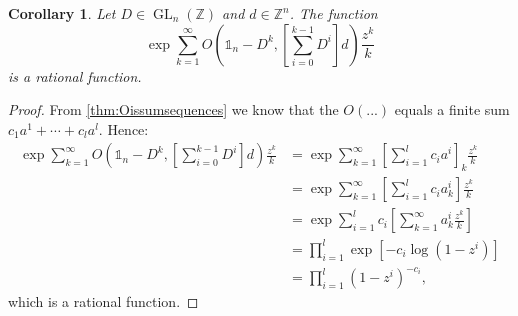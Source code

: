 \documentclass[a4paper]{article}
\theoremstyle{plain}
\newtheorem{lemma}[theorem]{Lemma}
\newtheorem{corollary}[theorem]{Corollary}
\theoremstyle{definition}
\theoremstyle{remark}
\DeclareMathOperator{\GL}{GL}
\newcommand{\I}{\mathds{1}}
\newcommand{\NN}{{\mathbb{N}}}
\newcommand{\ZZ}{{\mathbb{Z}}}
\begin{document}
\begin{corollary}
	\label{lem:part2}
	Let \(D \in \GL_n(\ZZ)\) and \(d \in \ZZ^n\). The function
	\begin{equation*}
	\exp \sum_{k=1}^{\infty}
	O\left(\I_n-D^k,\left[\sum_{i=0}^{k-1}D^i\right] d\right) \frac{z^k}{k}
	\end{equation*}
	is a rational function.
\end{corollary}
\begin{proof}
From \cref{thm:Oissumsequences} we know that the \(O(...)\) equals a finite sum \(c_1a^1 + \cdots + c_la^l\). Hence:
\begin{align*}
	\exp \sum_{k=1}^{\infty}
O\left(\I_n-D^k,\left[\sum_{i=0}^{k-1}D^i\right] d\right) \frac{z^k}{k} &= \exp \sum_{k=1}^{\infty} \left[ \sum_{i=1}^l c_i a^i \right]_k\frac{z^k}{k}\\
&= \exp \sum_{k=1}^{\infty} \left[ \sum_{i=1}^l c_i a^i_k \right]\frac{z^k}{k}\\
&= \exp \sum_{i=1}^l c_i \left[\sum_{k=1}^{\infty}a^i_k \frac{z^k}{k}\right]\\
&= \prod_{i=1}^l  \exp \left[ - c_i \log(1-z^i) \right]\\
&= \prod_{i=1}^l  (1-z^i)^{-c_i},
\end{align*}
which is a rational function.
\end{proof}

\iffalse
\begin{lemma}
	Let \(D \in \GL_n(\ZZ), d \in \ZZ^n\). The quantity
	\begin{equation*}
	O\left(\mathds{1}_n-D^k,\left[\sum_{i=0}^{k-1}D^i\right] d\right)
	\end{equation*}
	is periodic in \(k\).
\end{lemma}
\begin{proof}
	Let us consider everything mod \(2\). Because \(\GL_n(\ZZ_2)\) is finite, there exists some \(l \in \NN\) such that \(D^l = \I_n\). Then clearly \(\I_n - D^l\) is periodic in \(k\) with period \(l\). On the other hand, we have 
	\begin{align*}
	\sum_{i=0}^{2l-1}D^i &= \sum_{i=0}^{l-1}D^i + \sum_{i=l}^{2l-1}D^i\\
	&= \sum_{i=0}^{l-1}D^i + \sum_{i=0}^{l-1}D^{i+l}\\
	&= \sum_{i=0}^{l-1}D^i + \sum_{i=0}^{l-1}D^i\\
	&= 0,
	\end{align*}
	hence this sum is periodic with period $2l$. So clearly $O(...)$ is periodic with period $2l$. 
\end{proof}\fi
\end{document}
